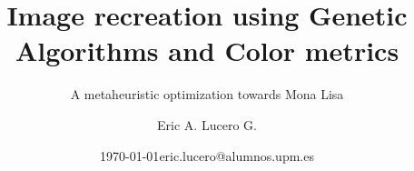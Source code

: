 \documentclass{beamer}
\author[Eric Lucero G.]{Eric A. Lucero G.}
\institute{Universidad Politécnica de Madrid}
\date{\tiny{\today}}
\title{Image recreation using Genetic Algorithms and Color metrics}
\subtitle{A metaheuristic optimization towards Mona Lisa}
\date{eric.lucero@alumnos.upm.es}
\begin{document}
\begin{frame}[plain]
    \titlepage{}
\end{frame}
% 


% 
% 
% 
% 
% 
% 
\end{document}
